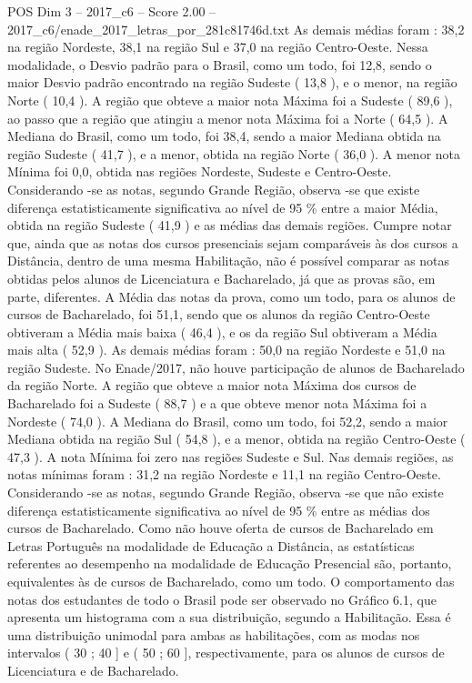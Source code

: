 \begin{textsample}{POS Dim 3 – 2017\_c6 – Score 2.00 – 2017\_c6/enade\_2017\_letras\_por\_281c81746d.txt}
As demais médias foram : 38,2 na região Nordeste, 38,1 na região Sul e 37,0 na região Centro-Oeste.
Nessa modalidade, o Desvio padrão para o Brasil, como um todo, foi 12,8, sendo o maior Desvio padrão encontrado na região Sudeste ( 13,8 ), e o menor, na região Norte ( 10,4 ).
A região que obteve a maior nota Máxima foi a Sudeste ( 89,6 ), ao passo que a região que atingiu a menor nota Máxima foi a Norte ( 64,5 ).
A Mediana do Brasil, como um todo, foi 38,4, sendo a maior Mediana obtida na região Sudeste ( 41,7 ), e a menor, obtida na região Norte ( 36,0 ).
A menor nota Mínima foi 0,0, obtida nas regiões Nordeste, Sudeste e Centro-Oeste.
Considerando -se as notas, segundo Grande Região, observa -se que existe diferença estatisticamente significativa ao nível de 95 \% entre a maior Média, obtida na região Sudeste ( 41,9 ) e as médias das demais regiões.
Cumpre notar que, ainda que as notas dos cursos presenciais sejam comparáveis às dos cursos a Distância, dentro de uma mesma Habilitação, não é possível comparar as notas obtidas pelos alunos de Licenciatura e Bacharelado, já que as provas são, em parte, diferentes.
A Média das notas da prova, como um todo, para os alunos de cursos de Bacharelado, foi 51,1, sendo que os alunos da região Centro-Oeste obtiveram a Média mais baixa ( 46,4 ), e os da região Sul obtiveram a Média mais alta ( 52,9 ).
As demais médias foram : 50,0 na região Nordeste e 51,0 na região Sudeste.
No Enade/2017, não houve participação de alunos de Bacharelado da região Norte.
A região que obteve a maior nota Máxima dos cursos de Bacharelado foi a Sudeste ( 88,7 ) e a que obteve menor nota Máxima foi a Nordeste ( 74,0 ).
A Mediana do Brasil, como um todo, foi 52,2, sendo a maior Mediana obtida na região Sul ( 54,8 ), e a menor, obtida na região Centro-Oeste ( 47,3 ).
A nota Mínima foi zero nas regiões Sudeste e Sul.
Nas demais regiões, as notas mínimas foram : 31,2 na região Nordeste e 11,1 na região Centro-Oeste.
Considerando -se as notas, segundo Grande Região, observa -se que não existe diferença estatisticamente significativa ao nível de 95 \% entre as médias dos cursos de Bacharelado.
Como não houve oferta de cursos de Bacharelado em Letras Português na modalidade de Educação a Distância, as estatísticas referentes ao desempenho na modalidade de Educação Presencial são, portanto, equivalentes às de cursos de Bacharelado, como um todo.
O comportamento das notas dos estudantes de todo o Brasil pode ser observado no Gráfico 6.1, que apresenta um histograma com a sua distribuição, segundo a Habilitação.
Essa é uma distribuição unimodal para ambas as habilitações, com as modas nos intervalos ( 30 ; 40 ] e ( 50 ; 60 ], respectivamente, para os alunos de cursos de Licenciatura e de Bacharelado.

\end{textsample}
